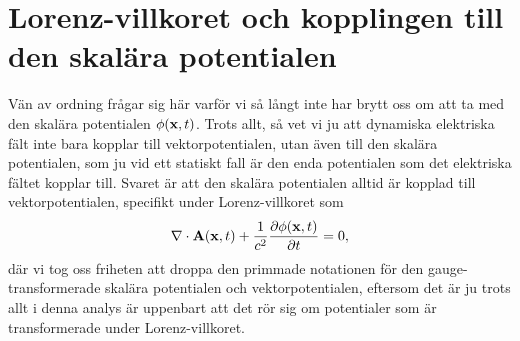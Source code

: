 {{{{{{\section{Lorenz-villkoret och kopplingen till den skal{\"a}ra potentialen}
V{\"a}n av ordning fr{\aa}gar sig h{\"a}r varf{\"o}r vi s{\aa} l{\aa}ngt inte
har brytt oss om att ta med den skal{\"a}ra potentialen $\phi({\bf x},t)$.
Trots allt, s{\aa} vet vi ju att dynamiska elektriska f{\"a}lt inte bara
kopplar till vektorpotentialen, utan {\"a}ven till den skal{\"a}ra potentialen,
som ju vid ett statiskt fall {\"a}r den enda potentialen som det elektriska
f{\"a}ltet kopplar till. Svaret {\"a}r att den skal{\"a}ra potentialen alltid
{\"a}r kopplad till vektorpotentialen, specifikt under Lorenz-villkoret som
$$
  \nabla\cdot{\bf A}({\bf x},t)+
    {{1}\over{c^2}}{{\partial\phi({\bf x},t)}\over{\partial t}} = 0,
$$
d{\"a}r vi tog oss friheten att droppa den primmade notationen%
f{\"o}r den gauge-transformerade skal{\"a}ra potentialen och vektorpotentialen,
eftersom det {\"a}r ju trots allt i denna analys {\"a}r uppenbart att det
r{\"o}r sig om potentialer som {\"a}r transformerade under Lorenz-villkoret.

}}}}}}
